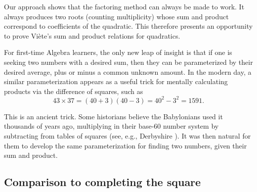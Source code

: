 Our approach shows that the factoring method can always be made to work. It
always produces two roots (counting multiplicity) whose sum and product
correspond to coefficients of the quadratic. This therefore presents an
opportunity to prove Vi\`ete's sum and product relations for quadratics.

For first-time Algebra learners, the only new leap of insight is that if one is
seeking two numbers with a desired sum, then they can be parameterized by their
desired average, plus or minus a common unknown amount. In the modern day, a
similar parameterization appears as a useful trick for mentally calculating
products via the difference of squares, such as
\begin{displaymath}
  43 \times 37 = (40 + 3)(40 - 3) = 40^2 - 3^2 = 1591.
\end{displaymath}

This is an ancient trick. Some historians believe the Babylonians used it
thousands of years ago, multiplying in their base-60 number system by
subtracting from tables of squares (see, e.g., Derbyshire
\cite{derbyshire}). It was then natural for them to develop the same
parameterization for finding two numbers, given their sum and product.



\subsection{Comparison to completing the square}

